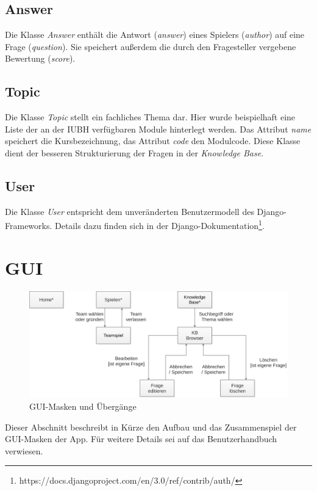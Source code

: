\documentclass[a4paper,11pt,listof=numbered,glossary=totoc,parskip=half,toc=bib]{scrreprt}
\begin{document}
	\subsection{Answer}
	Die Klasse \textit{Answer} enthält die Antwort (\textit{answer}) eines Spielers (\textit{author}) auf eine Frage (\textit{question}). Sie speichert außerdem die durch den Fragesteller vergebene Bewertung (\textit{score}).
	
	\subsection{Topic}
	Die Klasse \textit{Topic} stellt ein fachliches Thema dar. Hier wurde beispielhaft eine Liste der an der IUBH verfügbaren Module hinterlegt werden. Das Attribut \textit{name} speichert die Kursbezeichnung, das Attribut \textit{code} den Modulcode. Diese Klasse dient der besseren Strukturierung der Fragen in der \textit{Knowledge Base}.

	\subsection{User}
	Die Klasse \textit{User} entspricht dem unveränderten Benutzermodell des Django-Frameworks. Details dazu finden sich in der Django-Dokumentation\footnote{https://docs.djangoproject.com/en/3.0/ref/contrib/auth/}.	
	
	\section{GUI}
	
	\begin{figure}
		\centering
		\includegraphics[width=\textwidth]{gui.png}
		\caption{GUI-Masken und Übergänge}
		\label{fig:gui}
	\end{figure}
	
	Dieser Abschnitt beschreibt in Kürze den Aufbau und das Zusammenspiel der GUI-Masken der App. Für weitere Details sei auf das Benutzerhandbuch verwiesen.
	
\end{document}
